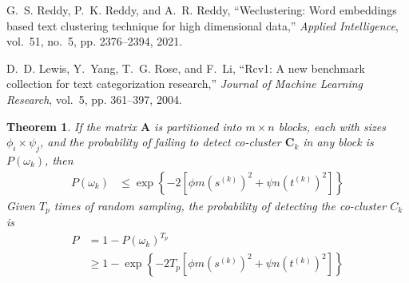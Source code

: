 \documentclass[letterpaper, 10 pt, conference]{ieeeconf}  %
\newtheorem{theorem}{Theorem}
\begin{document}
\begin{thebibliography}{10}
        G.~S. Reddy, P.~K. Reddy, and A.~R. Reddy, ``Weclustering: Word embeddings
        based text clustering technique for high dimensional data,'' \emph{Applied
                Intelligence}, vol.~51, no.~5, pp. 2376--2394, 2021.

        D.~D. Lewis, Y.~Yang, T.~G. Rose, and F.~Li, ``Rcv1: A new benchmark collection
        for text categorization research,'' \emph{Journal of Machine Learning
                Research}, vol.~5, pp. 361--397, 2004.

\end{thebibliography}



\appendix

\begin{theorem}
    \label{thm:probability_co_cluster_detection}
    If the matrix $\mathbf{A}$ is partitioned into $m \times n$ blocks, each with sizes $\phi_i \times \psi_j$, and the probability of failing to detect co-cluster $\mathbf{C}_k$ in any block is $P(\omega_k)$, then
    \begin{equation}
        \begin{split}
            P(\omega_k) & \le \exp \left\{ -2 [\phi m (s^{(k)})^2 + \psi n (t^{(k)})^2] \right\}
        \end{split}
    \end{equation}
    Given $T_p$ times of random sampling, the probability of detecting the co-cluster $C_k$ is
    \begin{equation}
        \begin{split}
            P & = 1 - P(\omega_k)^{T_p}                                                        \\
              & \ge 1 - \exp \left\{ -2 T_p [\phi m (s^{(k)})^2 + \psi n (t^{(k)})^2] \right\}
        \end{split}
    \end{equation}

\end{theorem}
\end{document}
